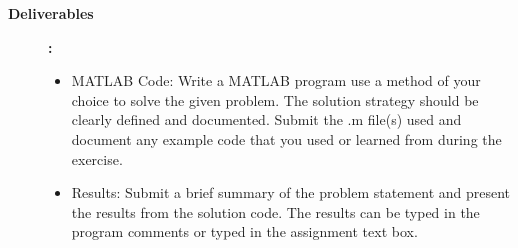 \documentclass[11pt]{article}
\begin{document}
\begin{description}
\begin{enumerate}
  \end{enumerate}

  \item [\textbf{ \large Deliverables}] \textbf{ \Large :}\\
    \begin{itemize} 
   
      \item MATLAB Code:
Write a MATLAB program use a method of your choice to solve the given problem. The solution strategy should be clearly defined and documented. Submit the .m file(s) used and document any example code that you used or learned from during the exercise.

      \item Results:
Submit a brief summary of the problem statement and present the results from the solution code. The results can be typed in the program comments or typed in the assignment text box.

    \end{itemize}
  \end{description}
 
\end{document}
